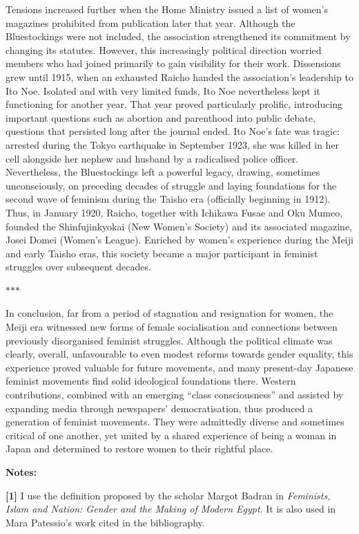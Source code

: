\documentclass[11pt,a4paper]{article}
\newcommand{\partbreak}{\par\begin{center}\color{muted}$\ast$\quad$\ast$\quad$\ast$\end{center}\par}
\begin{document}
Tensions increased further when the Home Ministry issued a list of women's magazines prohibited from publication later that year. Although the Bluestockings were not included, the association strengthened its commitment by changing its statutes. However, this increasingly political direction worried members who had joined primarily to gain visibility for their work. Dissensions grew until 1915, when an exhausted Raicho handed the association's leadership to Ito Noe. Isolated and with very limited funds, Ito Noe nevertheless kept it functioning for another year. That year proved particularly prolific, introducing important questions such as abortion and parenthood into public debate, questions that persisted long after the journal ended. Ito Noe's fate was tragic: arrested during the Tokyo earthquake in September 1923, she was killed in her cell alongside her nephew and husband by a radicalised police officer. Nevertheless, the Bluestockings left a powerful legacy, drawing, sometimes unconsciously, on preceding decades of struggle and laying foundations for the second wave of feminism during the Taisho era (officially beginning in 1912). Thus, in January 1920, Raicho, together with Ichikawa Fusae and Oku Mumeo, founded the Shinfujinkyokai (New Women's Society) and its associated magazine, Josei Domei (Women's League). Enriched by women's experience during the Meiji and early Taisho eras, this society became a major participant in feminist struggles over subsequent decades.

\partbreak

In conclusion, far from a period of stagnation and resignation for women, the Meiji era witnessed new forms of female socialisation and connections between previously disorganised feminist struggles. Although the political climate was clearly, overall, unfavourable to even modest reforms towards gender equality, this experience proved valuable for future movements, and many present-day Japanese feminist movements find solid ideological foundations there. Western contributions, combined with an emerging ``class consciousness'' and assisted by expanding media through newspapers' democratisation, thus produced a generation of feminist movements. They were admittedly diverse and sometimes critical of one another, yet united by a shared experience of being a woman in Japan and determined to restore women to their rightful place.

\textbf{Notes:}

\textbf{{[}1{]}} I use the definition proposed by the scholar Margot Badran in \emph{Feminists, Islam and Nation: Gender and the Making of Modern Egypt}. It is also used in Mara Patessio's work cited in the bibliography.
\end{document}
